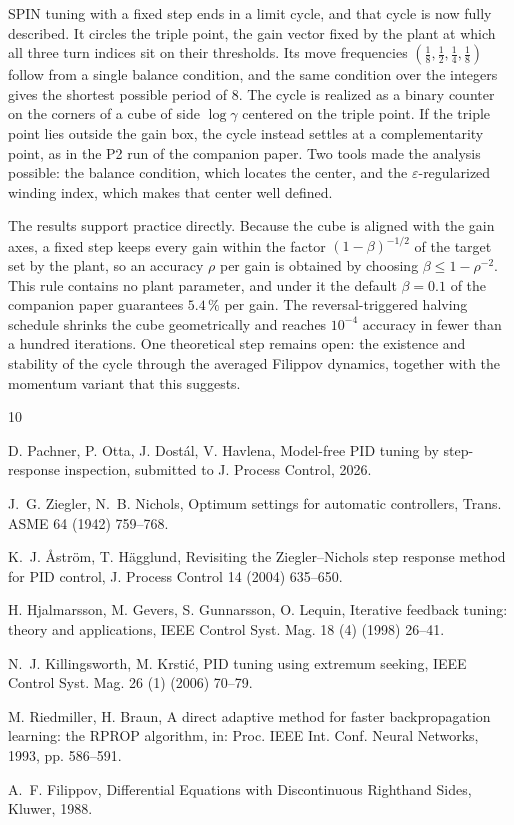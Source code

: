\documentclass[letterpaper, 10pt, conference, twocolumn]{ieeeconf}
\begin{document}
SPIN tuning with a fixed step ends in a limit cycle, and that cycle is now
fully described. It circles the triple point, the gain vector fixed by the
plant at which all three turn indices sit on their thresholds. Its move
frequencies $(\tfrac18, \tfrac12, \tfrac14, \tfrac18)$ follow from a single
balance condition, and the same condition over the integers gives the shortest
possible period of $8$. The cycle is realized as a binary counter on the
corners of a cube of side $\log\gamma$ centered on the triple point. If the
triple point lies outside the gain box, the cycle instead settles at a
complementarity point, as in the P2 run of the companion paper. Two tools made
the analysis possible: the balance condition, which locates the center, and the
$\varepsilon$-regularized winding index, which makes that center well defined.

The results support practice directly. Because the cube is aligned with the
gain axes, a fixed step keeps every gain within the factor $(1-\beta)^{-1/2}$
of the target set by the plant, so an accuracy $\rho$ per gain is obtained by
choosing $\beta \le 1-\rho^{-2}$. This rule contains no plant parameter, and
under it the default $\beta = 0.1$ of the companion paper guarantees
$5.4\,\%$ per gain. The reversal-triggered halving schedule shrinks the cube
geometrically and reaches $10^{-4}$ accuracy in fewer than a hundred
iterations. One theoretical step remains open: the existence and stability of
the cycle through the averaged Filippov dynamics, together with the momentum
variant that this suggests.

\small
\begin{thebibliography}{10}
\itemsep0pt

D. Pachner, P. Otta, J. Dost\'al, V. Havlena, Model-free PID tuning by
step-response inspection, submitted to J. Process Control, 2026.

J.~G. Ziegler, N.~B. Nichols, Optimum settings for automatic controllers,
Trans. ASME 64 (1942) 759--768.

K.~J. {\AA}str{\"o}m, T. H{\"a}gglund, Revisiting the Ziegler--Nichols
step response method for PID control, J. Process Control 14 (2004) 635--650.

H. Hjalmarsson, M. Gevers, S. Gunnarsson, O. Lequin, Iterative feedback
tuning: theory and applications, IEEE Control Syst. Mag. 18 (4) (1998)
26--41.

N.~J. Killingsworth, M. Krsti{\'c}, PID tuning using extremum seeking,
IEEE Control Syst. Mag. 26 (1) (2006) 70--79.

M. Riedmiller, H. Braun, A direct adaptive method for faster backpropagation
learning: the RPROP algorithm, in: Proc. IEEE Int. Conf. Neural Networks,
1993, pp. 586--591.

A.~F. Filippov, Differential Equations with Discontinuous Righthand Sides,
Kluwer, 1988.

\end{thebibliography}
\end{document}
